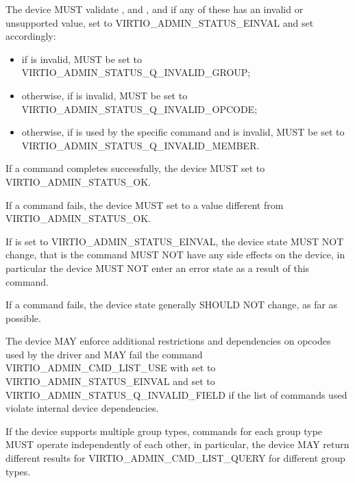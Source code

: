 
The device MUST validate ,  and
, and if any of these has an invalid or
unsupported value, set  to
VIRTIO_ADMIN_STATUS_EINVAL and set 
accordingly:
\begin{itemize}
\item if  is invalid, 
	MUST be set to VIRTIO_ADMIN_STATUS_Q_INVALID_GROUP;
\item otherwise, if  is invalid,
	 MUST be set to
	VIRTIO_ADMIN_STATUS_Q_INVALID_OPCODE;
\item otherwise, if  is used by the
	specific command and is invalid,  MUST be
	set to VIRTIO_ADMIN_STATUS_Q_INVALID_MEMBER.
\end{itemize}

If a command completes successfully, the device MUST set
 to VIRTIO_ADMIN_STATUS_OK.

If a command fails, the device MUST set
 to a value different from VIRTIO_ADMIN_STATUS_OK.

If  is set to VIRTIO_ADMIN_STATUS_EINVAL, the
device state MUST NOT change, that is the command MUST NOT have
any side effects on the device, in particular the device MUST NOT
enter an error state as a result of this command.

If a command fails, the device state generally SHOULD NOT change,
as far as possible.

The device MAY enforce additional restrictions and dependencies on
opcodes used by the driver and MAY fail the command
VIRTIO_ADMIN_CMD_LIST_USE with  set to VIRTIO_ADMIN_STATUS_EINVAL
and  set to VIRTIO_ADMIN_STATUS_Q_INVALID_FIELD
if the list of commands used violate internal device dependencies.

If the device supports multiple group types, commands for each group
type MUST operate independently of each other, in particular,
the device MAY return different results for VIRTIO_ADMIN_CMD_LIST_QUERY
for different group types.

